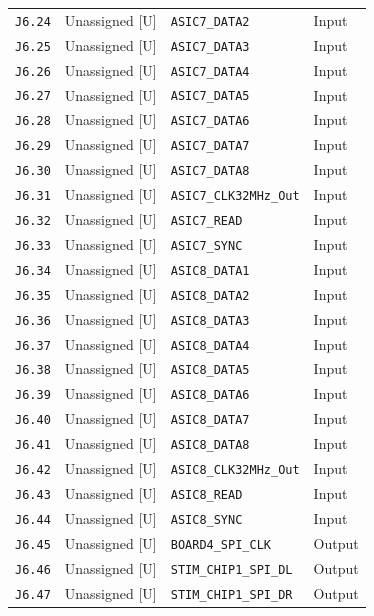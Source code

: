 \documentclass[11pt,a4paper]{article}
\begin{document}
\begin{longtable}{@{}P{21mm}P{34mm}P{78mm}P{33mm}@{}}
\nolinkurl{J6.24} & Unassigned [U] & \nolinkurl{ASIC7_DATA2} & Input \\
\nolinkurl{J6.25} & Unassigned [U] & \nolinkurl{ASIC7_DATA3} & Input \\
\nolinkurl{J6.26} & Unassigned [U] & \nolinkurl{ASIC7_DATA4} & Input \\
\nolinkurl{J6.27} & Unassigned [U] & \nolinkurl{ASIC7_DATA5} & Input \\
\nolinkurl{J6.28} & Unassigned [U] & \nolinkurl{ASIC7_DATA6} & Input \\
\nolinkurl{J6.29} & Unassigned [U] & \nolinkurl{ASIC7_DATA7} & Input \\
\nolinkurl{J6.30} & Unassigned [U] & \nolinkurl{ASIC7_DATA8} & Input \\
\nolinkurl{J6.31} & Unassigned [U] & \nolinkurl{ASIC7_CLK32MHz_Out} & Input \\
\nolinkurl{J6.32} & Unassigned [U] & \nolinkurl{ASIC7_READ} & Input \\
\nolinkurl{J6.33} & Unassigned [U] & \nolinkurl{ASIC7_SYNC} & Input \\
\nolinkurl{J6.34} & Unassigned [U] & \nolinkurl{ASIC8_DATA1} & Input \\
\nolinkurl{J6.35} & Unassigned [U] & \nolinkurl{ASIC8_DATA2} & Input \\
\nolinkurl{J6.36} & Unassigned [U] & \nolinkurl{ASIC8_DATA3} & Input \\
\nolinkurl{J6.37} & Unassigned [U] & \nolinkurl{ASIC8_DATA4} & Input \\
\nolinkurl{J6.38} & Unassigned [U] & \nolinkurl{ASIC8_DATA5} & Input \\
\nolinkurl{J6.39} & Unassigned [U] & \nolinkurl{ASIC8_DATA6} & Input \\
\nolinkurl{J6.40} & Unassigned [U] & \nolinkurl{ASIC8_DATA7} & Input \\
\nolinkurl{J6.41} & Unassigned [U] & \nolinkurl{ASIC8_DATA8} & Input \\
\nolinkurl{J6.42} & Unassigned [U] & \nolinkurl{ASIC8_CLK32MHz_Out} & Input \\
\nolinkurl{J6.43} & Unassigned [U] & \nolinkurl{ASIC8_READ} & Input \\
\nolinkurl{J6.44} & Unassigned [U] & \nolinkurl{ASIC8_SYNC} & Input \\
\nolinkurl{J6.45} & Unassigned [U] & \nolinkurl{BOARD4_SPI_CLK} & Output \\
\nolinkurl{J6.46} & Unassigned [U] & \nolinkurl{STIM_CHIP1_SPI_DL} & Output \\
\nolinkurl{J6.47} & Unassigned [U] & \nolinkurl{STIM_CHIP1_SPI_DR} & Output \\

\end{longtable}
\end{document}
